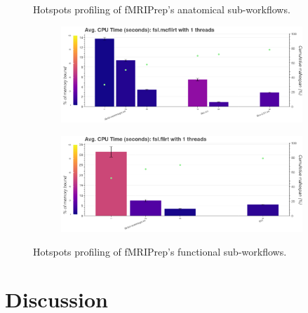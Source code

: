 \documentclass[conference]{IEEEtran}
\begin{document}
\begin{figure}[ht!]
	\caption{Hotspots profiling of fMRIPrep's anatomical sub-workflows.}
	\label{fig:hotspots-fmriprep-anat-subworkflow}
\end{figure}
					
\begin{figure}[ht!]
	\centering
	\begin{subfigure}[t]{0.49\textwidth}
		\caption{}
		\label{subfig:hotspots-fsl-mcflirt}
		\includegraphics[width=\textwidth]{figures/hotspots-1thread-fsl-mcflirt.png}
	\end{subfigure}
	\hfill
	\begin{subfigure}[t]{0.49\textwidth}
		\caption{}
		\label{subfig:hotspots-fsl-flirt}
		\includegraphics[width=\textwidth]{figures/hotspots-1thread-fsl-flirt.png}
	\end{subfigure}
																																																																																											
	\caption{Hotspots profiling of fMRIPrep's functional sub-workflows.}
	\label{fig:hotspots-fmriprep-func-subworkflow}
\end{figure}
					
\section{Discussion}
					
\end{document}
